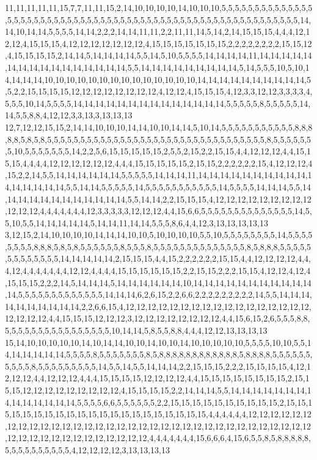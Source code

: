 11,11,11,11,11,15,7,7,11,11,15,2,14,10,10,10,10,14,10,10,10,5,5,5,5,5,5,5,5,5,5,5,5,5,5,5,5,5,5,5,5,5,5,5,5,5,5,5,5,5,5,5,5,5,5,5,5,5,5,5,5,5,5,5,5,5,5,5,5,5,5,5,5,5,5,5,5,5,5,14,14,10,14,14,5,5,5,5,14,14,2,2,2,14,14,11,11,2,2,11,11,14,5,14,2,14,15,15,15,4,4,4,12,12,12,4,15,15,15,4,12,12,12,12,12,12,12,4,15,15,15,15,15,15,15,2,2,2,2,2,2,2,2,15,15,12,4,15,15,15,15,2,14,14,5,14,14,14,14,5,5,14,5,10,5,5,5,5,14,14,14,14,11,14,14,14,14,14,14,14,14,14,14,14,14,14,14,14,14,5,5,14,14,14,14,14,14,14,14,14,5,14,5,5,5,10,5,10,14,14,14,14,10,10,10,10,10,10,10,10,10,10,10,10,10,10,14,14,14,14,14,14,14,14,14,14,5,5,2,2,15,15,15,15,12,12,12,12,12,12,12,12,4,12,12,4,15,15,15,4,12,3,3,12,12,3,3,3,3,4,5,5,5,10,14,5,5,5,5,14,14,14,14,14,14,14,14,14,14,14,14,14,14,5,5,5,5,5,8,5,5,5,5,5,14,14,5,5,8,8,4,12,12,3,3,13,3,13,13,13
12,7,12,12,15,15,2,14,14,10,10,10,14,14,10,10,14,14,5,10,14,5,5,5,5,5,5,5,5,5,5,5,8,8,8,8,8,5,8,5,8,5,5,5,5,5,5,5,5,5,5,5,5,5,5,5,5,5,5,5,5,5,5,5,5,5,5,5,5,5,5,5,5,5,8,5,5,5,5,5,5,5,10,5,5,5,5,5,5,5,14,2,2,5,6,15,15,15,15,15,2,5,5,2,15,2,2,15,15,4,4,12,12,12,4,4,15,15,15,4,4,4,4,12,12,12,12,12,12,4,4,4,15,15,15,15,15,2,15,15,2,2,2,2,2,2,15,4,12,12,12,4,15,2,2,14,5,5,14,14,14,14,14,14,5,5,5,5,5,14,14,14,11,14,14,14,14,14,14,14,14,14,14,14,14,14,14,14,14,5,5,14,14,5,5,5,5,5,14,5,5,5,5,5,5,5,5,5,5,5,14,5,5,5,5,14,14,14,5,5,14,14,14,14,14,14,14,14,14,14,14,14,5,5,14,14,2,2,15,15,15,4,12,12,12,12,12,12,12,12,12,12,12,12,4,4,4,4,4,4,4,12,3,3,3,3,3,12,12,12,4,4,15,6,6,5,5,5,5,5,5,5,5,5,5,5,5,5,5,14,5,5,10,5,5,14,14,14,14,14,5,14,14,11,14,14,5,5,5,8,6,4,4,12,3,13,13,13,13,13
3,12,15,2,14,10,10,10,10,14,14,14,10,10,5,10,10,10,10,5,5,10,5,5,5,5,5,5,5,5,14,5,5,5,5,5,5,5,5,8,8,8,5,8,5,8,5,5,5,5,5,5,8,5,5,5,8,5,5,5,5,5,5,5,5,5,5,5,5,5,5,8,5,8,8,8,5,5,5,5,5,5,5,5,5,5,5,5,5,14,14,14,14,14,2,15,15,15,4,4,15,2,2,2,2,2,2,15,15,4,4,12,12,12,12,4,4,4,12,4,4,4,4,4,4,4,12,12,4,4,4,4,15,15,15,15,15,15,2,2,15,15,2,2,2,15,15,4,12,12,4,12,4,15,15,15,2,2,2,14,5,14,14,14,5,14,14,14,14,14,14,10,14,14,14,14,14,14,14,14,14,14,14,14,5,5,5,5,5,5,5,5,5,5,5,5,5,14,14,14,6,2,6,15,2,2,6,6,2,2,2,2,2,2,2,2,2,14,5,5,14,14,14,14,14,14,14,14,14,14,2,2,6,6,15,4,12,12,12,12,12,12,12,12,12,12,12,12,12,12,12,12,12,12,12,12,12,4,4,15,15,15,12,12,12,3,12,12,12,12,12,12,12,12,4,4,15,6,15,2,6,5,5,5,8,8,5,5,5,5,5,5,5,5,5,5,5,5,5,5,5,5,10,14,14,5,8,5,5,8,8,4,4,4,12,12,13,13,13,13
15,14,10,10,10,10,10,14,10,14,14,10,10,14,10,10,14,10,10,10,10,10,5,5,5,5,10,10,5,5,14,14,14,14,14,14,5,5,5,5,8,5,5,5,5,5,5,5,8,5,8,8,8,8,8,8,8,8,8,8,8,8,5,8,8,8,8,5,5,5,5,5,5,5,5,5,5,8,5,5,5,5,5,5,5,5,5,14,5,5,14,5,5,14,14,14,2,2,15,15,15,2,2,2,15,15,15,15,4,12,12,12,12,4,4,12,12,12,4,4,4,15,15,15,15,12,12,12,12,4,4,15,15,15,15,15,15,15,15,2,15,15,15,12,12,12,12,12,12,12,12,12,4,15,15,15,15,2,2,14,14,14,5,5,14,14,14,14,14,14,14,14,14,14,14,14,14,14,5,5,5,5,6,6,5,5,5,5,5,5,2,2,15,15,15,15,15,15,15,15,15,15,2,15,15,15,15,15,15,15,15,15,15,15,15,15,15,15,15,15,15,15,15,15,4,4,4,4,4,4,12,12,12,12,12,12,12,12,12,12,12,12,12,12,12,12,12,12,12,12,12,12,12,12,12,12,12,12,12,12,12,12,12,12,12,12,12,12,12,12,12,12,12,12,12,12,12,4,4,4,4,4,4,4,15,6,6,6,4,15,6,5,5,8,5,8,8,8,8,8,5,5,5,5,5,5,5,5,5,5,4,12,12,12,12,3,13,13,13,13
